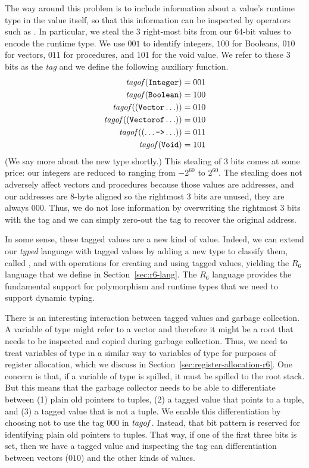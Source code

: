 \documentclass[11pt]{book}
\begin{document}
The way around this problem is to include information about a value's
runtime type in the value itself, so that this information can be
inspected by operators such as .  In particular, we 
steal the 3 right-most bits from our 64-bit values to encode the
runtime type.  We use $001$ to identify integers, $100$ for
Booleans, $010$ for vectors, $011$ for procedures, and $101$ for the
void value. We refer to these 3 bits as the \emph{tag} and we
define the following auxiliary function.
\begin{align*}
\mathit{tagof}(\texttt{Integer}) &= 001 \\
\mathit{tagof}(\texttt{Boolean}) &= 100 \\
\mathit{tagof}((\texttt{Vector} \ldots)) &= 010 \\
\mathit{tagof}((\texttt{Vectorof} \ldots)) &= 010 \\
\mathit{tagof}((\ldots \texttt{->} \ldots)) &= 011 \\
\mathit{tagof}(\texttt{Void}) &= 101
\end{align*}
(We say more about the new  type shortly.)
This stealing of 3 bits comes at some
price: our integers are reduced to ranging from $-2^{60}$ to
$2^{60}$. The stealing does not adversely affect vectors and
procedures because those values are addresses, and our addresses are
8-byte aligned so the rightmost 3 bits are unused, they are always
$000$. Thus, we do not lose information by overwriting the rightmost 3
bits with the tag and we can simply zero-out the tag to recover the
original address.

In some sense, these tagged values are a new kind of value.  Indeed,
we can extend our \emph{typed} language with tagged values by adding a
new type to classify them, called , and with operations for
creating and using tagged values, yielding the $R_6$ language that we
define in Section~\ref{sec:r6-lang}. The $R_6$ language provides the
fundamental support for polymorphism and runtime types that we need to
support dynamic typing.

There is an interesting interaction between tagged values and garbage
collection.  A variable of type  might refer to a vector and
therefore it might be a root that needs to be inspected and copied
during garbage collection. Thus, we need to treat variables of type
 in a similar way to variables of type  for
purposes of register allocation, which we discuss in
Section~\ref{sec:register-allocation-r6}. One concern is that, if a
variable of type  is spilled, it must be spilled to the root
stack.  But this means that the garbage collector needs to be able to
differentiate between (1) plain old pointers to tuples, (2) a tagged
value that points to a tuple, and (3) a tagged value that is not a
tuple. We enable this differentiation by choosing not to use the tag
$000$ in $\mathit{tagof}$. Instead, that bit pattern is reserved for
identifying plain old pointers to tuples. That way, if one of the
first three bits is set, then we have a tagged value and inspecting
the tag can differentiation between vectors ($010$) and the other
kinds of values.
\end{document}
